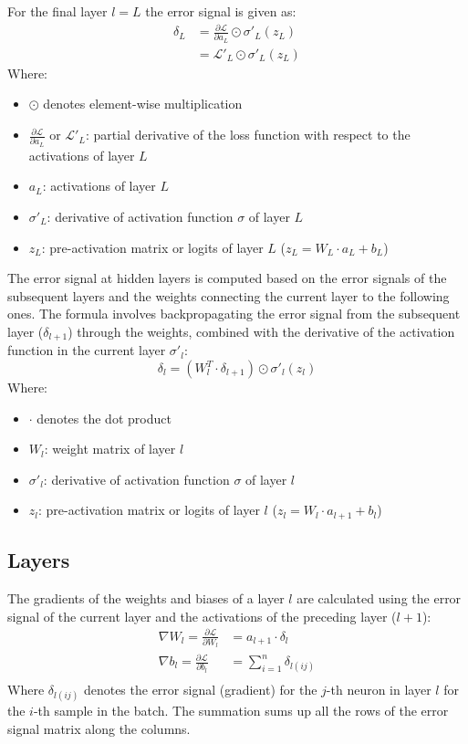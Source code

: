 \documentclass[a4paper]{report}
\newcommand{\ELL}{\mathcal{L}}
\begin{document}
For the final layer $l=L$ the error signal is given as:
\begin{align*}
    \delta_L &= \frac{\partial\ELL}{\partial a_L} \odot \sigma'_L(z_L)\\
                &= \ELL'_L \odot \sigma'_L(z_L)
\end{align*}
Where:
\begin{itemize}
    \item $\odot$ denotes element-wise multiplication
    \item $\frac{\partial\ELL}{\partial a_L}$ or $\ELL'_L$: partial derivative of the loss function with respect to the activations of layer $L$
    \item $a_L$: activations of layer $L$
    \item $\sigma'_L$: derivative of activation function $\sigma$ of layer $L$
    \item $z_L$: pre-activation matrix or logits of layer $L$ ($z_L = W_L\cdot a_L + b_L$)
\end{itemize}
The error signal at hidden layers is computed based on the error signals of the subsequent layers and the weights connecting the current layer to the following ones. The formula involves backpropagating the error signal from the subsequent layer ($\delta_{l+1}$) through the weights, combined with the derivative of the activation function in the current layer $\sigma'_l$:
\begin{equation*}
    \delta_l = (W_l^T \cdot \delta_{l+1}) \odot \sigma'_l(z_l)
\end{equation*}
Where:
\begin{itemize}
    \item $\cdot$ denotes the dot product
    \item $W_l$: weight matrix of layer $l$
    \item $\sigma'_l$: derivative of activation function $\sigma$ of layer $l$
    \item $z_l$: pre-activation matrix or logits of layer $l$ ($z_l = W_l\cdot a_{l+1} + b_l$)
\end{itemize}

\subsection{Layers}
The gradients of the weights and biases of a layer $l$ are calculated using the error signal of the current layer and the activations of the preceding layer ($l+1$):
\begin{align*}
    \nabla W_l = \frac{\partial\ELL}{\partial W_l} &= a_{l+1} \cdot \delta_l \\
    \nabla b_l =\frac{\partial\ELL}{\partial b_l} &= \sum_{i=1}^{n} \delta_{l(ij)} \\
\end{align*}
Where $\delta_{l(ij)}$ denotes the error signal (gradient) for the $j$-th neuron in layer $l$ for the $i$-th sample in the batch. The summation sums up all the rows of the error signal matrix along the columns.
\end{document}
